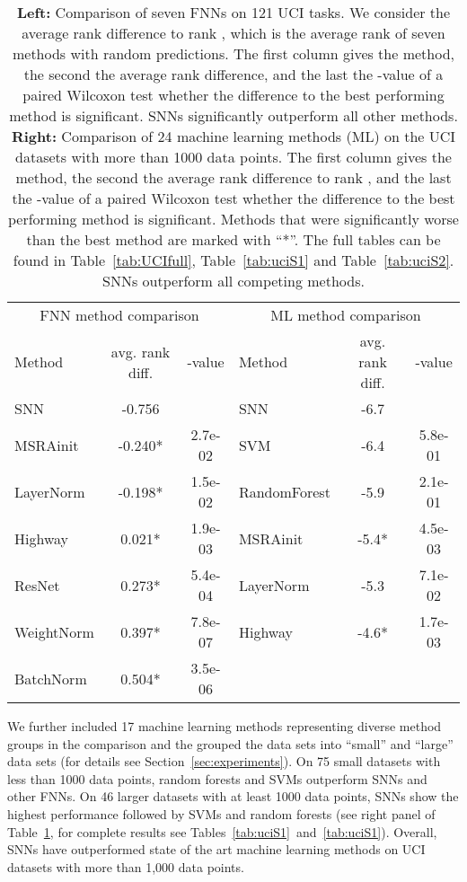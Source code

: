 \documentclass{article}
\begin{document}
\begin{table}[htp]
\caption[Comparison of seven FNNs on 121 UCI tasks]{{\bf Left:} Comparison of seven FNNs on 121 UCI tasks. 
We consider the average rank difference to rank , which is
the average rank of seven methods with random predictions. 
The first column gives the method, the second 
the average rank difference, and the last the -value 
of a paired Wilcoxon test whether the difference to the best performing 
method is significant.
SNNs significantly outperform all other methods.
{\bf Right:} Comparison of 24 machine learning methods (ML) on the UCI datasets
with more than 1000 data points. 
The first column gives the method, the second 
the average rank difference to rank , and the last the -value 
of a paired Wilcoxon test whether the difference to the best performing 
method is significant. Methods that were significantly worse than
the best method are marked with ``*''.
The full tables can be found in Table~\ref{tab:UCIfull}, Table~\ref{tab:uciS1} and Table~\ref{tab:uciS2}.
SNNs outperform all competing methods. 
\label{tab:uci} \label{tab:uci2}}
\centering
\begin{tabular}{lcclcc}
  \toprule
\multicolumn{3}{c}{FNN method comparison}   &  \multicolumn{3}{c}{ML method comparison} \\
 Method      & avg. rank diff. & -value  & Method  &  avg. rank diff. & -value \\ 
    \midrule
SNN         & -0.756 &  &  SNN &  -6.7  &  \\ 
MSRAinit    & -0.240* &    { 2.7e-02}  & SVM  &  -6.4  &  5.8e-01 \\ 
LayerNorm   & -0.198*  &    { 1.5e-02} &  RandomForest &  -5.9  &  2.1e-01 \\ 
Highway     & 0.021*  &    { 1.9e-03} &  MSRAinit &  -5.4* &  { 4.5e-03} \\ 
ResNet      & 0.273* &    { 5.4e-04} &  LayerNorm &  -5.3  &  7.1e-02 \\ 
WeightNorm  & 0.397* &    { 7.8e-07} &  Highway &  -4.6* &  { 1.7e-03} \\ 
BatchNorm   & 0.504* &    { 3.5e-06} &   &    &   \\ 
\bottomrule
\end{tabular}
\end{table}

We further included 17 machine learning methods representing diverse method groups \citep{bib:Fernandez2014} 
in the comparison and 
the grouped the data sets into ``small'' and ``large'' data sets (for details see Section~\ref{sec:experiments}).
On 75 small datasets with less than 1000 data points, random forests and SVMs outperform SNNs and other FNNs. 
On 46 larger datasets with at least 1000 data points, 
SNNs show the highest performance followed by SVMs and random forests (see right panel of Table~\ref{tab:uci2},
for complete results see Tables~\ref{tab:uciS1}~and~\ref{tab:uciS1}).
Overall, SNNs have outperformed state of the art machine learning methods on UCI datasets
with more than 1,000 data points.
\end{document}
